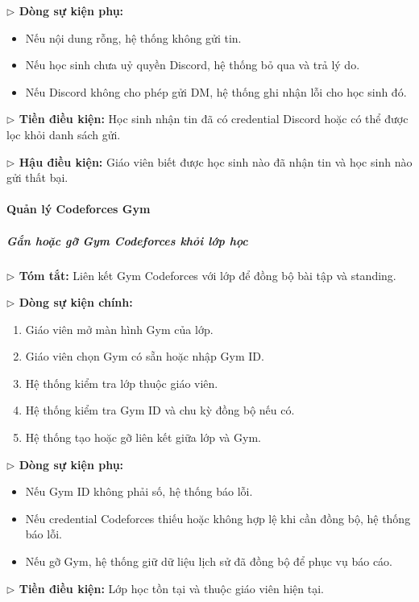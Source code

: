 \documentclass[12pt,a4paper]{article}
\begin{document}
\textbf{$\triangleright$ Dòng sự kiện phụ:}
\begin{itemize}[leftmargin=*]
\item Nếu nội dung rỗng, hệ thống không gửi tin.
\item Nếu học sinh chưa uỷ quyền Discord, hệ thống bỏ qua và trả lý do.
\item Nếu Discord không cho phép gửi DM, hệ thống ghi nhận lỗi cho học sinh đó.
\end{itemize}

\textbf{$\triangleright$ Tiền điều kiện:} Học sinh nhận tin đã có credential Discord hoặc có thể được lọc khỏi danh sách gửi.

\textbf{$\triangleright$ Hậu điều kiện:} Giáo viên biết được học sinh nào đã nhận tin và học sinh nào gửi thất bại.

\paragraph{Quản lý Codeforces Gym}

\subparagraph{Gắn hoặc gỡ Gym Codeforces khỏi lớp học}
\textbf{$\triangleright$ Tóm tắt:} Liên kết Gym Codeforces với lớp để đồng bộ bài tập và standing.

\textbf{$\triangleright$ Dòng sự kiện chính:}
\begin{enumerate}[leftmargin=*]
\item Giáo viên mở màn hình Gym của lớp.
\item Giáo viên chọn Gym có sẵn hoặc nhập Gym ID.
\item Hệ thống kiểm tra lớp thuộc giáo viên.
\item Hệ thống kiểm tra Gym ID và chu kỳ đồng bộ nếu có.
\item Hệ thống tạo hoặc gỡ liên kết giữa lớp và Gym.
\end{enumerate}

\textbf{$\triangleright$ Dòng sự kiện phụ:}
\begin{itemize}[leftmargin=*]
\item Nếu Gym ID không phải số, hệ thống báo lỗi.
\item Nếu credential Codeforces thiếu hoặc không hợp lệ khi cần đồng bộ, hệ thống báo lỗi.
\item Nếu gỡ Gym, hệ thống giữ dữ liệu lịch sử đã đồng bộ để phục vụ báo cáo.
\end{itemize}

\textbf{$\triangleright$ Tiền điều kiện:} Lớp học tồn tại và thuộc giáo viên hiện tại.
\end{document}
